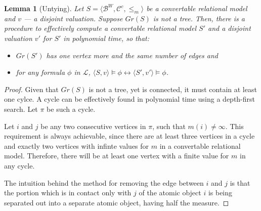 \documentclass{article}
\newtheorem*{lemma}{Lemma}
\newcommand{\B}{\mathcal{B}}
\newcommand{\lang}{\mathcal{L}}
\begin{document}
\begin{lemma}[Untying]
  Let $S = \langle \B^W, \mathcal{C}^c, \leq_m \rangle$ be a convertable relational model and $v$ --- a disjoint valuation. Suppose $Gr(S)$ is not a tree.
  Then, there is a procedure to effectively compute a convertable relational model $S'$ and a disjoint valuation $v'$ for $S'$ in polynomial time, so that:
  \begin{itemize}
  \item $Gr(S')$ has one vertex more and the same number of edges and
  \item for any formula $\phi$ in $\lang$, $\langle S, v \rangle \models \phi \longleftrightarrow \langle S', v' \rangle \models \phi$.
  \end{itemize}
\end{lemma}
\begin{proof}
  Given that $Gr(S)$ is not a tree, yet is connected, it must contain at least one cylce. A cycle can be effectively found in polynomial time using a depth-first search. Let $\pi$ be such a cycle.

  Let $i$ and $j$ be any two consecutive vertices in $\pi$, such that $m(i) \neq \infty$. This requirement is always achievable, since there are at least three vertices in a cycle and exactly two vertices with infinte values for $m$ in a convertable relational model. Therefore, there will be at least one vertex with a finite value for $m$ in any cycle.

  The intuition behind the method for removing the edge between $i$ and $j$ is that the portion which is in contact only with $j$ of the atomic object $i$ is being separated out into a separate atomic object, having half the measure.


\end{proof}
\end{document}
